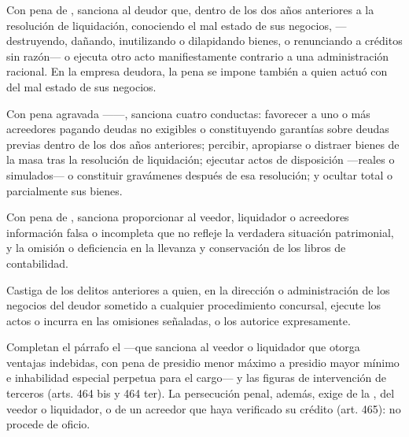 \begin{description}[leftmargin=0pt,style=nextline,font=\sffamily\bfseries]
  \item[Artículo 463 — Reducción del activo] Con pena de , sanciona al deudor que, dentro de los dos años anteriores a la resolución de
  liquidación, conociendo el mal estado de sus negocios,  ---destruyendo, dañando, inutilizando o dilapidando bienes, o renunciando a créditos
  sin razón--- o ejecuta otro acto manifiestamente contrario a una administración racional. En la
  empresa deudora, la pena se impone también a quien actuó con 
  del mal estado de sus negocios.

  \item[Artículo 463 bis — Ocultación y distracción] Con pena agravada ------, sanciona cuatro conductas: favorecer
  a uno o más acreedores pagando deudas no exigibles o constituyendo garantías sobre deudas
  previas dentro de los dos años anteriores; percibir, apropiarse o distraer bienes de la masa
  tras la resolución de liquidación; ejecutar actos de disposición ---reales o simulados--- o
  constituir gravámenes después de esa resolución; y ocultar total o parcialmente sus bienes.

  \item[Artículo 463 ter — Contabilidad e información] Con pena de , sanciona proporcionar al veedor, liquidador o acreedores información
  falsa o incompleta que no refleje la verdadera situación patrimonial, y la omisión o deficiencia
  en la llevanza y conservación de los libros de contabilidad.

  \item[Artículo 463 quáter — Extensión a administradores] Castiga  de los
  delitos anteriores a quien, en la dirección o administración de los negocios del deudor sometido
  a cualquier procedimiento concursal, ejecute los actos o incurra en las omisiones señaladas, o
  los autorice expresamente.
\end{description}

Completan el párrafo el  ---que sanciona al veedor o liquidador que otorga
ventajas indebidas, con pena de presidio menor máximo a presidio mayor mínimo e inhabilidad
especial perpetua para el cargo--- y las figuras de intervención de terceros (arts. 464 bis y
464 ter). La persecución penal, además, exige  de la \superir{},
del veedor o liquidador, o de un acreedor que haya verificado su crédito (art. 465): no procede de
oficio.

